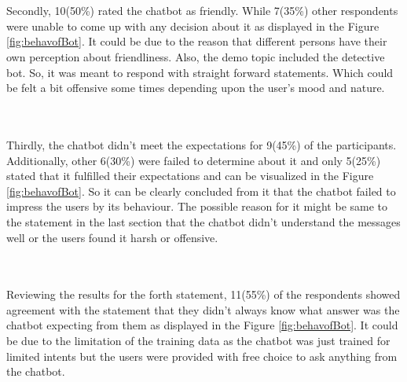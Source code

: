 \\~\\
Secondly, 10(50\%) rated the chatbot as friendly. While 7(35\%) other respondents were unable to come up with any decision about it as displayed in the Figure \ref{fig:behavofBot}. It could be due to the reason that different persons have their own perception about friendliness. Also, the demo topic included the detective bot. So, it was meant to respond with straight forward statements. Which could be felt a bit offensive some times depending upon the user's mood and nature. 

\\~\\
Thirdly, the chatbot didn't meet the expectations for 9(45\%) of the participants. Additionally, other 6(30\%) were failed to determine about it and only 5(25\%) stated that it fulfilled their expectations and can be visualized in the Figure \ref{fig:behavofBot}. So it can be clearly concluded from it that the chatbot failed to impress the users by its behaviour. The possible reason for it might be same to the statement in the last section that the chatbot didn't understand the messages well or the users found it harsh or offensive.

\\~\\
Reviewing the results for the forth statement, 11(55\%) of the respondents showed agreement with the statement that they didn't always know what answer was the chatbot expecting from them as displayed in the Figure \ref{fig:behavofBot}. It could be due to the limitation of the training data as the chatbot was just trained for limited intents but the users were provided with free choice to ask anything from the chatbot. 


